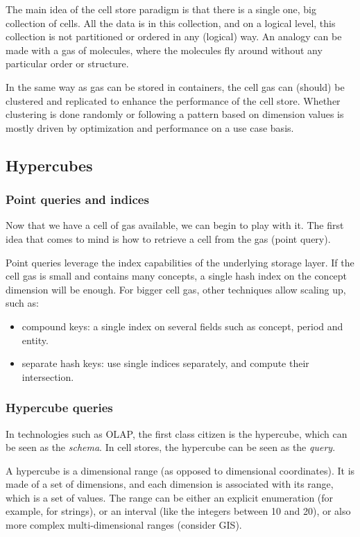 \documentclass{vldb}
\begin{document}
The main idea of the cell store paradigm is that there is a single one, big collection of cells. All the data is in this collection, and on a logical level, this collection is not partitioned or ordered in any (logical) way. An analogy can be made with a gas of molecules, where the molecules fly around without any particular order or structure.

In the same way as gas can be stored in containers, the cell gas can (should) be clustered and replicated to enhance the performance of the cell store. Whether clustering is done randomly or following a pattern based on dimension values is mostly driven by optimization and performance on a use case basis.

\subsection{Hypercubes}

\subsubsection{Point queries and indices}

Now that we have a cell of gas available, we can begin to play with it. The first idea that comes to mind is how to retrieve a cell from the gas (point query).

Point queries leverage the index capabilities of the underlying storage layer. If the cell gas is small and contains many concepts, a single hash index on the concept dimension will be enough. For bigger cell gas, other techniques allow scaling up, such as:
\begin{itemize}
\item compound keys: a single index on several fields such as concept, period and entity.
\item separate hash keys: use single indices separately, and compute their intersection.
\end{itemize}

\subsubsection{Hypercube queries}
In technologies such as OLAP, the first class citizen is the hypercube, which can be seen as the \emph{schema}. In cell stores, the hypercube can be seen as the \emph{query}.

A hypercube is a dimensional range (as opposed to dimensional coordinates). It is made of a set of dimensions, and each dimension is associated with its range, which is a set of values. The range can be either an explicit enumeration (for example, for strings), or an interval (like the integers between 10 and 20), or also more complex multi-dimensional ranges (consider GIS).
\end{document}

